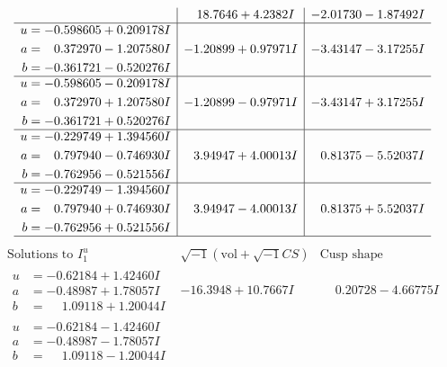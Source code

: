 \documentclass[1p]{elsarticle_modified}
\theoremstyle{definition}
\newcommand{\I}{\sqrt{-1}}
\begin{document}
$$\begin{array}{c|c|c}
 & \phantom{-}18.7646 + 4.2382 I & -2.01730 - 1.87492 I \\ \hline\begin{aligned}
u &= -0.598605 + 0.209178 I \\
a &= \phantom{-}0.372970 - 1.207580 I \\
b &= -0.361721 - 0.520276 I\end{aligned}
 & -1.20899 + 0.97971 I & -3.43147 - 3.17255 I \\ \hline\begin{aligned}
u &= -0.598605 - 0.209178 I \\
a &= \phantom{-}0.372970 + 1.207580 I \\
b &= -0.361721 + 0.520276 I\end{aligned}
 & -1.20899 - 0.97971 I & -3.43147 + 3.17255 I \\ \hline\begin{aligned}
u &= -0.229749 + 1.394560 I \\
a &= \phantom{-}0.797940 - 0.746930 I \\
b &= -0.762956 - 0.521556 I\end{aligned}
 & \phantom{-}3.94947 + 4.00013 I & \phantom{-}0.81375 - 5.52037 I \\ \hline\begin{aligned}
u &= -0.229749 - 1.394560 I \\
a &= \phantom{-}0.797940 + 0.746930 I \\
b &= -0.762956 + 0.521556 I\end{aligned}
 & \phantom{-}3.94947 - 4.00013 I & \phantom{-}0.81375 + 5.52037 I\\
 \hline 
 \end{array}$$\newpage$$\begin{array}{c|c|c}  
\text{Solutions to }I^u_{1}& \I (\text{vol} + \sqrt{-1}CS) & \text{Cusp shape}\\
 \hline 
\begin{aligned}
u &= -0.62184 + 1.42460 I \\
a &= -0.48987 + 1.78057 I \\
b &= \phantom{-}1.09118 + 1.20044 I\end{aligned}
 & -16.3948 + 10.7667 I & \phantom{-}0.20728 - 4.66775 I \\ \hline\begin{aligned}
u &= -0.62184 - 1.42460 I \\
a &= -0.48987 - 1.78057 I \\
b &= \phantom{-}1.09118 - 1.20044 I\end{aligned}

\end{array}$$
\end{document}
